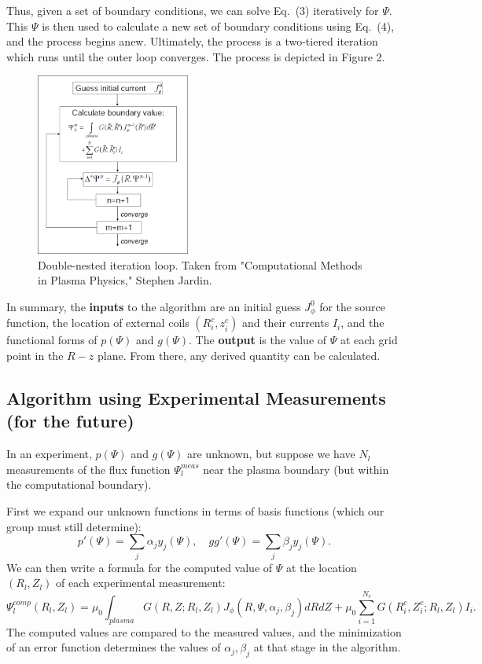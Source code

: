 \documentclass[paper=letter, fontsize=11pt]{scrartcl} %
\begin{document}
Thus, given a set of boundary conditions, we can solve Eq.~(3) iteratively for $\Psi$.  This $\Psi$ is then used to calculate a new set of boundary conditions using Eq.~(4), and the process begins anew.  Ultimately, the process is a two-tiered iteration which runs until the outer loop converges.  The process is depicted in Figure 2.

\begin{figure}
\centering
\captionsetup{justification=centering,margin=3cm}
\caption[caption]{Double-nested iteration loop. Taken from "Computational Methods in Plasma Physics," Stephen Jardin.}
\includegraphics[width=0.45\textwidth]{algorithm}
\end{figure}

In summary, the \textbf{inputs} to the algorithm are an initial guess $J_\phi^0$ for the source function, the location of external coils $(R_i^c,z_i^c)$ and their currents $I_i$, and the functional forms of $p(\Psi)$ and $g(\Psi)$.  The \textbf{output} is the value of $\Psi$ at each grid point in the $R-z$ plane.  From there, any derived quantity can be calculated.  

\subsection{Algorithm using Experimental Measurements (for the future)}

In an experiment, $p(\Psi)$ and $g(\Psi)$ are unknown, but suppose we have $N_l$ measurements of the flux function $\Psi_l^{meas}$ near the plasma boundary (but within the computational boundary).  

First we expand our unknown functions in terms of basis functions (which our group must still determine):
\begin{equation}
p'(\Psi) = \sum_j \alpha_j y_j(\Psi), \quad gg'(\Psi) = \sum_j \beta_j y_j(\Psi).
\end{equation}
We can then write a formula for the computed value of $\Psi$ at the location $(R_l, Z_l)$ of each experimental measurement: 
\begin{equation}
\Psi_l^{comp}(R_l, Z_l) = \mu_0 \int_{plasma} G(R,Z; R_l,Z_l) J_\phi(R,\Psi,\alpha_j,\beta_j) dR dZ + \mu_0 \sum_{i=1}^{N_c} G(R_i^c,Z_i^c; R_l,Z_l) I_i.
\end{equation}
The computed values are compared to the measured values, and the minimization of an error function determines the values of $\alpha_j, \beta_j$ at that stage in the algorithm.   
\end{document}
